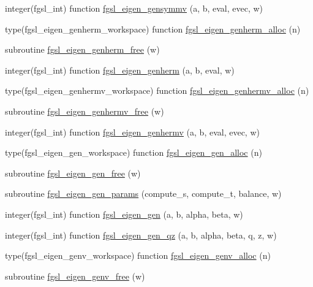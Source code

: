 \begin{DoxyCompactItemize}
integer(fgsl\+\_\+int) function \hyperlink{eigen_8finc_ad9e2195ef21d925f7e963185cb59e435}{fgsl\+\_\+eigen\+\_\+gensymmv} (a, b, eval, evec, w)
\item 
type(fgsl\+\_\+eigen\+\_\+genherm\+\_\+workspace) function \hyperlink{eigen_8finc_af69d430a7febbfb70b4021a765d9535d}{fgsl\+\_\+eigen\+\_\+genherm\+\_\+alloc} (n)
\item 
subroutine \hyperlink{eigen_8finc_a6c25ef96c06da3c1ff3926200f36e55b}{fgsl\+\_\+eigen\+\_\+genherm\+\_\+free} (w)
\item 
integer(fgsl\+\_\+int) function \hyperlink{eigen_8finc_a7742445ebb20b3ce43ece2c8ce92b3cb}{fgsl\+\_\+eigen\+\_\+genherm} (a, b, eval, w)
\item 
type(fgsl\+\_\+eigen\+\_\+genhermv\+\_\+workspace) function \hyperlink{eigen_8finc_a757b1df46b9949413e56c2fb40193358}{fgsl\+\_\+eigen\+\_\+genhermv\+\_\+alloc} (n)
\item 
subroutine \hyperlink{eigen_8finc_a0f8e68362cb297494a149a2abd529499}{fgsl\+\_\+eigen\+\_\+genhermv\+\_\+free} (w)
\item 
integer(fgsl\+\_\+int) function \hyperlink{eigen_8finc_a234ce4166943e7c9fbdf662554831bc4}{fgsl\+\_\+eigen\+\_\+genhermv} (a, b, eval, evec, w)
\item 
type(fgsl\+\_\+eigen\+\_\+gen\+\_\+workspace) function \hyperlink{eigen_8finc_a93910023619c9d669e02f83b9109c26b}{fgsl\+\_\+eigen\+\_\+gen\+\_\+alloc} (n)
\item 
subroutine \hyperlink{eigen_8finc_acf1f0d8398d2124aaaf77d87fc4f97af}{fgsl\+\_\+eigen\+\_\+gen\+\_\+free} (w)
\item 
subroutine \hyperlink{eigen_8finc_ad892f962a1ec3cab90f26ef37668e631}{fgsl\+\_\+eigen\+\_\+gen\+\_\+params} (compute\+\_\+s, compute\+\_\+t, balance, w)
\item 
integer(fgsl\+\_\+int) function \hyperlink{eigen_8finc_af9248a86edc3501913a04bff373f5f16}{fgsl\+\_\+eigen\+\_\+gen} (a, b, alpha, beta, w)
\item 
integer(fgsl\+\_\+int) function \hyperlink{eigen_8finc_abe397b833eedb3cba80d2abde013bbe4}{fgsl\+\_\+eigen\+\_\+gen\+\_\+qz} (a, b, alpha, beta, q, z, w)
\item 
type(fgsl\+\_\+eigen\+\_\+genv\+\_\+workspace) function \hyperlink{eigen_8finc_ad5f5628460ae023f294684dc0d2b001c}{fgsl\+\_\+eigen\+\_\+genv\+\_\+alloc} (n)
\item 
subroutine \hyperlink{eigen_8finc_af448040f311f66e9ed9f1e86d6ee8abb}{fgsl\+\_\+eigen\+\_\+genv\+\_\+free} (w)
\item 

\end{DoxyCompactItemize}
